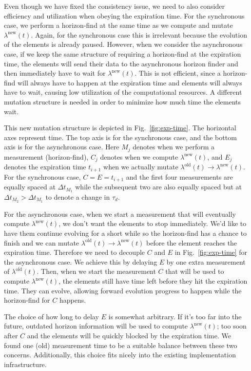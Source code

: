 \begin{bibunit}[unsrtnat]
Even though we have fixed the consistency issue, we need to also consider
efficiency and utilization when obeying the expiration time. For the synchronous
case, we perform a horizon-find at the same time as we compute and mutate
$\lambda^\mathrm{new}(t)$. Again, for the synchronous case this is irrelevant
because the evolution of the elements is already paused. However, when we
consider the asynchronous case, if we keep the same structure of requiring a
horizon-find at the expiration time, the elements will send their data to the
asynchronous horizon finder and then immediately have to wait for
$\lambda^\mathrm{new}(t)$. This is not efficient, since a horizon-find will
always have to happen at the expiration time and elements will always have to
wait, causing low utilization of the computational resources. A different
mutation structure is needed in order to minimize how much time the elements
wait.

This new mutation structure is depicted in Fig.~\ref{fig:exp-time}. The
horizontal axes represent time. The top axis is for the synchronous case, and
the bottom axis is for the asynchronous case. Here $M_j$ denotes when we perform
a measurement (horizon-find), $C_j$ denotes when we compute
$\lambda^\mathrm{new}(t)$, and $E_j$ denotes the expiration time $t_{i+1}$ when
we actually mutate $\lambda^\mathrm{old}(t)\rightarrow\lambda^\mathrm{new}(t)$.
For the synchronous case, $C=E=t_{i+1}$ and the first four measurements are
equally spaced at $\Delta t_{M_1}$ while the subsequent two are also equally
spaced but at $\Delta t_{M_2} > \Delta t_{M_1}$ to denote a change in $\tau_d$.

For the asynchronous case, when we start a measurement that will eventually
compute $\lambda^\mathrm{new}(t)$, we don't want the elements to stop
immediately. We'd like to have them continue evolving for a short while so the
horizon-find has a chance to finish and we can mutate
$\lambda^\mathrm{old}(t)\rightarrow\lambda^\mathrm{new}(t)$ before the element
reaches the expiration time. Therefore we need to decouple $C$ and $E$ in
Fig.~\ref{fig:exp-time} for the asynchronous case.
We achieve this by delaying $E$ by
one extra measurement of $\lambda^\mathrm{old}(t)$. Then, when we start the
measurement $C$ that will be used to compute $\lambda^\mathrm{new}(t)$, the
elements still have time left before they hit the expiration time.
They can evolve, allowing forward evolution progress to happen while
the horizon-find for $C$ happens.

The choice of how long to delay $E$ is somewhat arbitrary. If it's too far into
the future, outdated horizon information will be used to compute
$\lambda^\mathrm{new}(t)$; too soon after $C$ and the elements will be quickly
blocked by the expiration time. We found one (old) measurement time to be a
suitable balance between these two concerns. Additionally, this choice fits
nicely into the existing implementation infrastructure.


\end{bibunit}
